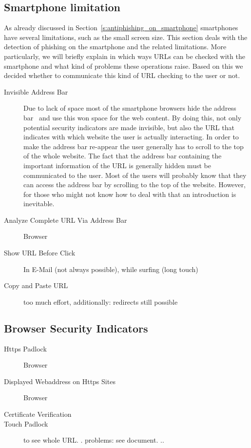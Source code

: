 \subsection{Smartphone limitation}
As already discussed in Section~\ref{s:antiphishing_on_smartphone} smartphones have several limitations, such as the small screen size. 
This section deals with the detection of phishing on the smartphone and the related limitations.
More particularly, we will briefly explain in which ways URLs can be checked with the smartphone and what kind of problems these operations raise.
Based on this we decided whether to communicate this kind of URL checking to the user or not.
\begin{description}
	\item[Invisible Address Bar] Due to lack of space most of the smartphone browsers hide the address bar~\cite{amrutkar2012measuring} and use this won space for the web content. 
By doing this, not only potential security indicators are made invisible, but also the URL that indicates with which website the user is actually interacting.
In order to make the address bar re-appear the user generally has to scroll to the top of the whole website.
The fact that the address bar containing the important information of the URL is generally hidden must be communicated to the user.
Most of the users will probably know that they can access the address bar by scrolling to the top of the website.
However, for those who might not know how to deal with that an introduction is inevitable.
	\item[Analyze Complete URL Via Address Bar] Browser
	\item[Show URL Before Click] In E-Mail (not always possible), while surfing (long touch)
	\item[Copy and Paste URL] too much effort, additionally: redirects still possible
\end{description}

\subsection{Browser Security Indicators}

\begin{description}
		\item[Https Padlock] Browser
		\item[Displayed Webaddress on Https Sites] Browser
		\item[Certificate Verification]
		\item[Touch Padlock] to see whole URL.
. problems: see document.
..
\end{description}

